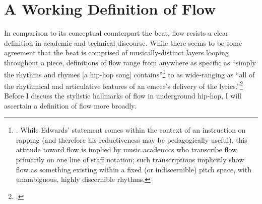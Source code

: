 \onehalfspacing
\label{chapter3}
\section{A Working Definition of Flow}

In comparison to its conceptual counterpart the beat, flow resists a clear definition in
academic and technical discourse. While there seems to be some agreement that the beat is
comprised of musically-distinct layers looping throughout a piece, definitions of flow 
range from anywhere as specific as ``simply the rhythms and rhymes [a hip-hop song] 
contains''\footnote{
    \autocite[63]{pauledwardsHowRapArt2009}. While Edwards' statement comes within the 
    context of an instruction on rapping (and therefore his reductiveness may be 
    pedagogically useful), this attitude toward flow is implied by music academics who 
    transcribe flow primarily on one line of staff notation; such transcriptions implicitly
    show flow as something existing within a fixed (or indiscernible) pitch space, with 
    unambiguous, highly discernible rhythms.} 
to as wide-ranging as ``all of the rhythmical and articulative features of an emcee's 
delivery of the lyrics.''\footnote{
    \cite{kyleadamsMetricalTechniquesFlow2009}.} 
Before I discuss the stylistic hallmarks of flow in underground hip-hop, I will ascertain
a definition of flow more broadly.

